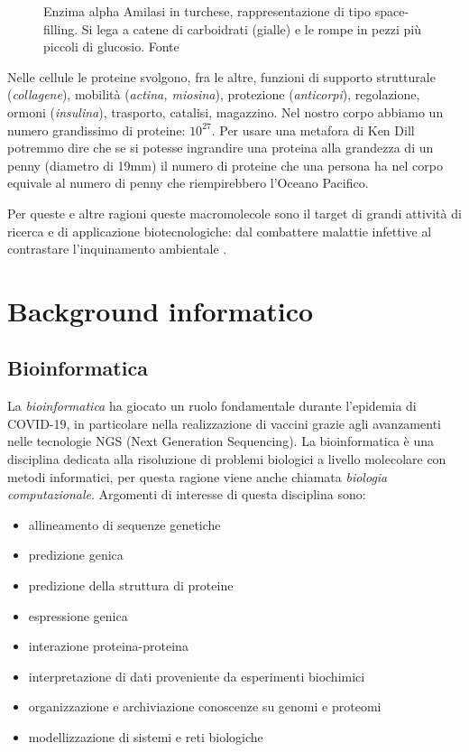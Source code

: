 \begin{figure}[!htb]
	\caption{Enzima alpha Amilasi in turchese, rappresentazione di tipo space-filling. Si lega a catene di carboidrati (gialle) e le rompe in pezzi più piccoli di glucosio. Fonte \cite{ProteinRCSB}}
	\label{fig:amilasi}
	\endminipage\hfill
\end{figure}


Nelle cellule le proteine svolgono, fra le altre, funzioni di supporto strutturale (\textit{collagene}), mobilità (\textit{actina, miosina}), protezione (\textit{anticorpi}), regolazione, ormoni (\textit{insulina}), trasporto, catalisi, magazzino. Nel nostro corpo abbiamo un numero grandissimo di proteine: $10^{27}$. Per usare una metafora di Ken Dill \supercite{TalksDill2013Oct} potremmo dire che se si potesse ingrandire una proteina alla grandezza di un penny (diametro di 19mm) il numero di proteine che una persona ha nel corpo equivale al numero di penny che riempirebbero l'Oceano Pacifico.

\par Per queste e altre ragioni queste macromolecole sono il target di grandi attività di ricerca e di applicazione biotecnologiche: dal combattere malattie infettive \supercite{batool2019structure} al contrastare l'inquinamento ambientale \supercite{knott2020characterization}.

\section{Background informatico}

\subsection{Bioinformatica}

La \textit{bioinformatica} ha giocato un ruolo fondamentale durante l'epidemia di COVID-19, in particolare nella realizzazione di vaccini grazie agli avanzamenti nelle tecnologie NGS (Next Generation Sequencing). La bioinformatica è una disciplina dedicata alla risoluzione di problemi biologici a livello molecolare con metodi informatici, per questa ragione viene anche chiamata \textit{biologia computazionale}. Argomenti di interesse di questa disciplina sono:
\begin{itemize}
	\item allineamento di sequenze genetiche
	\item predizione genica
	\item predizione della struttura di proteine
	\item espressione genica
	\item interazione proteina-proteina
	\item interpretazione di dati proveniente da esperimenti biochimici
	\item organizzazione e archiviazione conoscenze su genomi e proteomi
	\item modellizzazione di sistemi e reti biologiche
\end{itemize}

